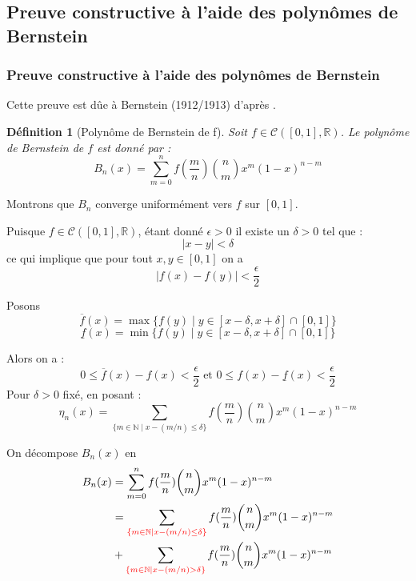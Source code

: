 \documentclass[
	10pt, %
	xcolor={svgnames}
]{beamer}
\newtheorem{defi}[subsubsection]{Définition}
\begin{document}
\begin{frame}
	\section{Preuve constructive à l'aide des polynômes de Bernstein}
	\frametitle{Preuve constructive à l'aide des polynômes de Bernstein}

	Cette preuve est dûe à Bernstein (1912/1913) d'après \cite[p.~ 42-45]{pinkus2000approximation}.
	\begin{defi}[Polynôme de Bernstein de f]
		Soit \( f \in \mathcal{C}([0,1],\mathbb{R}) \). Le polynôme de Bernstein de \( f \) est donné par :
	\begin{equation*}
		B_n(x) = \sum_{m=0}^{n} f(\frac{m}{n}) \binom{n}{m} x^{m}(1-x)^{n-m}
	\end{equation*}
	\end{defi}
Montrons que \( B_n \) converge uniformément vers \( f \) sur \( [0,1] \).


	Puisque \( f \in \mathcal{C}([0,1],\mathbb{R}) \), étant donné \( \epsilon > 0 \) il existe un \( \delta > 0 \) tel que :
	\begin{equation*}
		{\left\lvert x - y\right\rvert} < \delta
	\end{equation*}
	ce qui implique que pour tout \( x, y \in [0,1] \) on a 
	\begin{equation*}
		{\left\lvert f(x) - f(y) \right\rvert} < \frac{\epsilon}{2}
	\end{equation*}

\end{frame}
\begin{frame}
	Posons 
	\begin{equation*}
		\overline{f}(x) = \max\{f(y) \mid y \in [x-\delta, x+\delta] \cap [0,1]\}
	\end{equation*}
	\begin{equation*}
		\underline{f}(x) = \min\{f(y) \mid y \in [x-\delta, x+\delta] \cap [0,1]\}
	\end{equation*}

Alors on a : 
\begin{equation*}
	0 \leq \overline{f}(x) - f(x) < \frac{\epsilon}{2} \text{ et } 0 \leq f(x) - \underline{f}(x) < \frac{\epsilon}{2}
\end{equation*}
Pour \( \delta > 0  \) fixé, en posant :
\begin{equation*}
	\eta_n(x) = \sum_{\{m \in \mathbb{N} \mid x - (m/n) \leq \delta \}} f(\frac{m}{n}) \binom{n}{m} x^{m}(1-x)^{n-m}
\end{equation*}

On décompose \( B_n(x) \) en 
\begin{align*}
	B_n(x) &= \sum_{m=0}^{n} f(\frac{m}{n}) \binom{n}{m} x^{m}(1-x)^{n-m} \\
	       &= \sum_{\mathcolor{red}{\{m \in \mathbb{N} \mid x - (m/n) {\leq} \delta \}}} f(\frac{m}{n}) \binom{n}{m} x^{m}(1-x)^{n-m} \\
	       &+ \sum_{\mathcolor{red}{\{m \in \mathbb{N} \mid x - (m/n) > \delta \}}} f(\frac{m}{n}) \binom{n}{m} x^{m}(1-x)^{n-m} \\
\end{align*}
\end{frame}
\end{document}
